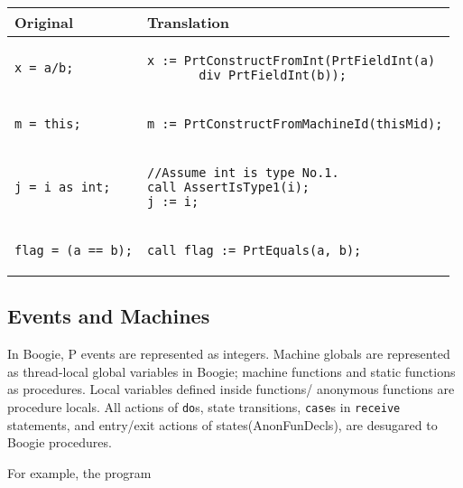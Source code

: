 \documentclass{llncs}
\providecommand{\tabularnewline}{\\}
\begin{document}
\begin{center}
\begin{tabular}{|p{}|p{}|}
\hline
\textbf{Original} & \textbf{Translation}
\tabularnewline
\hline
\hline

\begin{verbatim}
x = a/b;
\end{verbatim}
&
\begin{verbatim}
x := PrtConstructFromInt(PrtFieldInt(a) 
       div PrtFieldInt(b));
\end{verbatim}
\tabularnewline
\hline

\begin{verbatim}
m = this;
\end{verbatim}
&
\begin{verbatim}
m := PrtConstructFromMachineId(thisMid);
\end{verbatim}
\tabularnewline
\hline

\begin{verbatim}
j = i as int;
\end{verbatim}
&
\begin{verbatim}
//Assume int is type No.1.
call AssertIsType1(i);
j := i;
\end{verbatim}
\tabularnewline
\hline

\begin{verbatim}
flag = (a == b);
\end{verbatim}
&
\begin{verbatim}
call flag := PrtEquals(a, b);
\end{verbatim}
\tabularnewline
\hline

\end{tabular}
\end{center}


\subsection{Events and Machines}
\noindent In Boogie, P events are represented as integers. Machine globals are represented as thread-local global variables in Boogie; machine functions and static functions as procedures. Local variables defined inside functions/ anonymous functions are procedure locals. All actions of \texttt{do}s, state transitions, \texttt{case}s in \texttt{receive} statements, and entry/exit actions of states(AnonFunDecls), are desugared to Boogie procedures.

For example, the program
\end{document}

